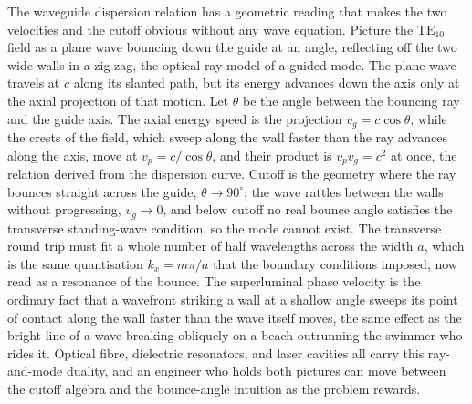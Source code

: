 \begin{mastery}
The waveguide dispersion relation has a geometric reading that makes the
two velocities and the cutoff obvious without any wave equation. Picture
the $\text{TE}_{10}$ field as a plane wave bouncing down the guide at an
angle, reflecting off the two wide walls in a zig-zag, the optical-ray
model of a guided mode. The plane wave travels at $c$ along its slanted
path, but its energy advances down the axis only at the axial projection
of that motion. Let $\theta$ be the angle between the bouncing ray and
the guide axis. The axial energy speed is the projection $v_g = c\cos
\theta$, while the crests of the field, which sweep along the wall faster
than the ray advances along the axis, move at $v_p = c/\cos\theta$, and
their product is $v_p v_g = c^2$ at once, the relation derived from the
dispersion curve. Cutoff is the geometry where the ray bounces straight
across the guide, $\theta\to 90^{\circ}$: the wave rattles between the
walls without progressing, $v_g\to 0$, and below cutoff no real bounce
angle satisfies the transverse standing-wave condition, so the mode
cannot exist. The transverse round trip must fit a whole number of half
wavelengths across the width $a$, which is the same quantisation
$k_x = m\pi/a$ that the boundary conditions imposed, now read as a
resonance of the bounce. The superluminal phase velocity is the ordinary
fact that a wavefront striking a wall at a shallow angle sweeps its point
of contact along the wall faster than the wave itself moves, the same
effect as the bright line of a wave breaking obliquely on a beach
outrunning the swimmer who rides it. Optical fibre, dielectric resonators,
and laser cavities all carry this ray-and-mode duality, and an engineer
who holds both pictures can move between the cutoff algebra and the
bounce-angle intuition as the problem rewards.
\end{mastery}

